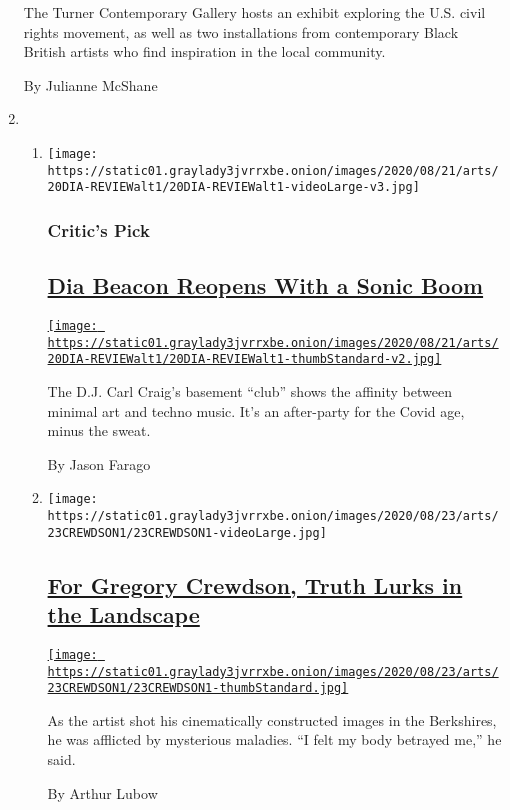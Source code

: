 \begin{enumerate}
  The Turner Contemporary Gallery hosts an exhibit exploring the U.S.
  civil rights movement, as well as two installations from contemporary
  Black British artists who find inspiration in the local community.

  By Julianne McShane
\item
  \begin{enumerate}
  \def\labelenumii{\arabic{enumii}.}
  \item
    \texttt{[image: https://static01.graylady3jvrrxbe.onion/images/2020/08/21/arts/20DIA-REVIEWalt1/20DIA-REVIEWalt1-videoLarge-v3.jpg]}

    \hypertarget{critics-pick}{%
    \subsubsection{Critic's Pick}\label{critics-pick}}

    \hypertarget{dia-beacon-reopens-with-a-sonic-boom}{%
    \subsection{\texorpdfstring{\href{/2020/08/20/arts/design/dia-beacon-reopen-coronavirus.html}{Dia
    Beacon Reopens With a Sonic
    Boom}}{Dia Beacon Reopens With a Sonic Boom}}\label{dia-beacon-reopens-with-a-sonic-boom}}

    \href{/2020/08/20/arts/design/dia-beacon-reopen-coronavirus.html}{\texttt{[image: https://static01.graylady3jvrrxbe.onion/images/2020/08/21/arts/20DIA-REVIEWalt1/20DIA-REVIEWalt1-thumbStandard-v2.jpg]}}

    The D.J. Carl Craig's basement ``club'' shows the affinity between
    minimal art and techno music. It's an after-party for the Covid age,
    minus the sweat.

    By Jason Farago
  \item
    \texttt{[image: https://static01.graylady3jvrrxbe.onion/images/2020/08/23/arts/23CREWDSON1/23CREWDSON1-videoLarge.jpg]}

    \hypertarget{for-gregory-crewdson-truth-lurks-in-the-landscape}{%
    \subsection{\texorpdfstring{\href{/2020/08/20/arts/design/gregory-crewdson-berkshires-photography.html}{For
    Gregory Crewdson, Truth Lurks in the
    Landscape}}{For Gregory Crewdson, Truth Lurks in the Landscape}}\label{for-gregory-crewdson-truth-lurks-in-the-landscape}}

    \href{/2020/08/20/arts/design/gregory-crewdson-berkshires-photography.html}{\texttt{[image: https://static01.graylady3jvrrxbe.onion/images/2020/08/23/arts/23CREWDSON1/23CREWDSON1-thumbStandard.jpg]}}

    As the artist shot his cinematically constructed images in the
    Berkshires, he was afflicted by mysterious maladies. ``I felt my
    body betrayed me,'' he said.

    By Arthur Lubow
  \end{enumerate}
\end{enumerate}

